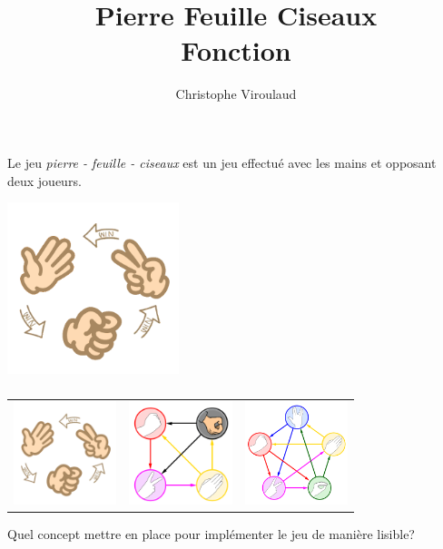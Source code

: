 \documentclass[svgnames,11pt]{beamer}
\author[]{Christophe Viroulaud}
\title{Pierre Feuille Ciseaux \\Fonction}
\date{\framebox{\textbf{Lang 05}}}
\institute{Première - NSI}
\begin{document}
\begin{frame}
\titlepage
\end{frame}
\begin{frame}
    \frametitle{}

    Le jeu \emph{pierre - feuille - ciseaux} est un jeu effectué avec les mains et opposant deux joueurs.
    \begin{center}
    \centering
    \includegraphics[width=5cm]{ressources/pfc.png}
    \label{IMG}
    \end{center}
\end{frame}
\begin{frame}
    \frametitle{}
\begin{center}
    \begin{tabular}{ccc}
        \includegraphics[width=3cm]{ressources/pfc.png}
        &
        \includegraphics[width=3cm]{ressources/pfcp.png}
        &
        \includegraphics[width=3cm]{ressources/pfcls.png}
    \end{tabular}
\end{center}
    \begin{center}
        \begin{framed}
            \centering Quel concept mettre en place pour implémenter le jeu de manière lisible?
        \end{framed}
    \end{center}

\end{frame}
\end{document}
